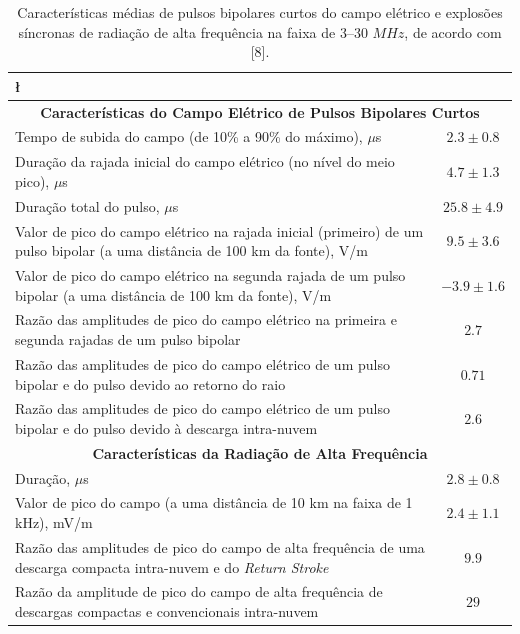 \documentclass[a4paper, 12pt, onecolumn,singlespacing]{article}
\begin{document}
	\begin{longtable}{@{}p{12cm}c@{}}
		\caption{Características médias de pulsos bipolares curtos do campo elétrico e explosões síncronas de radiação de alta frequência na faixa de 3--30 $MHz$, de acordo com [8].} \l\label{tabela1}\\
			\toprule
			\multicolumn{2}{c}{\textbf{Características  do Campo Elétrico de Pulsos Bipolares Curtos}} \\
			\midrule
			Tempo de subida do campo (de 10\% a 90\% do máximo), $\mu$s & $2.3 \pm 0.8$ \\
			Duração da rajada inicial do campo elétrico (no nível do meio pico), $\mu$s & $4.7 \pm 1.3$ \\
			Duração total do pulso, $\mu$s & $25.8 \pm 4.9$ \\
			Valor de pico do campo elétrico na rajada inicial (primeiro) de um pulso bipolar (a uma distância de 100 km da fonte), V/m & $9.5 \pm 3.6$ \\
			Valor de pico do campo elétrico na segunda rajada de um pulso bipolar (a uma distância de 100 km da fonte), V/m & $-3.9 \pm 1.6$ \\
			Razão das amplitudes de pico do campo elétrico na primeira e segunda rajadas de um pulso bipolar & $2.7$ \\
			Razão das amplitudes de pico do campo elétrico de um pulso bipolar e do pulso devido ao retorno do raio & $0.71$ \\
			Razão das amplitudes de pico do campo elétrico de um pulso bipolar e do pulso devido à descarga intra-nuvem & $2.6$ \\
			\midrule
			\multicolumn{2}{c}{\textbf{Características da Radiação de Alta Frequência}} \\
			\midrule
			Duração, $\mu$s & $2.8 \pm 0.8$ \\
			Valor de pico do campo (a uma distância de 10 km na faixa de 1 kHz), mV/m & $2.4 \pm 1.1$ \\
			Razão das amplitudes de pico do campo de alta frequência de uma descarga compacta intra-nuvem e do \textit{Return Stroke} & $9.9$ \\
			Razão da amplitude de pico do campo de alta frequência de descargas compactas e convencionais intra-nuvem & $29$ \\
			\bottomrule
	\end{longtable}
\end{document}
